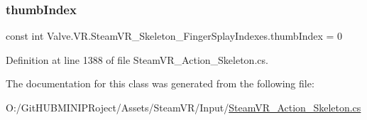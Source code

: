 \mbox{\label{class_valve_1_1_v_r_1_1_steam_v_r___skeleton___finger_splay_indexes_a595f94bfa71471df8bde2c21b9e9dcb0}} 
\subsubsection{\texorpdfstring{thumbIndex}{thumbIndex}}
{\footnotesize\ttfamily const int Valve.\+V\+R.\+Steam\+V\+R\+\_\+\+Skeleton\+\_\+\+Finger\+Splay\+Indexes.\+thumb\+Index = 0}



Definition at line 1388 of file Steam\+V\+R\+\_\+\+Action\+\_\+\+Skeleton.\+cs.



The documentation for this class was generated from the following file\+:\begin{DoxyCompactItemize}
\item 
O\+:/\+Git\+H\+U\+B\+M\+I\+N\+I\+P\+Roject/\+Assets/\+Steam\+V\+R/\+Input/\mbox{\hyperlink{_steam_v_r___action___skeleton_8cs}{Steam\+V\+R\+\_\+\+Action\+\_\+\+Skeleton.\+cs}}\end{DoxyCompactItemize}
